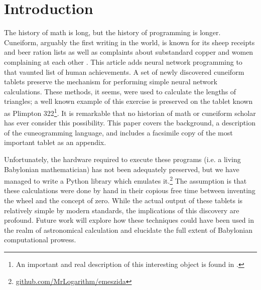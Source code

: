\documentclass[11pt]{article}
\title{\emeszida}
\author{First Author \\
  Affiliation / Address line 1 \\
  Affiliation / Address line 2 \\
  Affiliation / Address line 3 \\
  \texttt{email@domain} \\\And
  Second Author \\
  Affiliation / Address line 1 \\
  Affiliation / Address line 2 \\
  Affiliation / Address line 3 \\
  \texttt{email@domain} \\}
\begin{document}
\maketitle
\begin{abstract}
This paper announces the discovery of the use of neural nets almost 4,000 years before their use in the modern era.
Newly discovered tablets preserve a perceptron used for calculating the numbers on Plimpton 322, the most important object in the history of mathematics.
The native programming language used by the ancient Babylonian ``cuneogrammers'' uses sexagesimal numbering leading to some ``weirdness''.
\end{abstract}

\begin{abstract}[]
\end{abstract}

\section{Introduction}
The history of math is long, but the history of programming is longer.
Cuneiform, arguably the first writing in the world, is known for its sheep receipts and beer ration lists as well as complaints about substandard copper \cite{oppenheim1954} and women complaining at each other \cite{Matuszak2020}.
This article adds neural network programming to that vaunted list of human achievements.
A set of newly discovered cuneiform tablets preserve the mechanism for performing simple neural network calculations.
These methods, it seems, were used to calculate the lengths of triangles; a well known example of this exercise is preserved on the tablet known as Plimpton 322\footnote{An important and real description of this interesting object is found in \citet{robson2002}.}.
It is remarkable that no historian of math or cuneiform scholar has ever consider this possibility.
This paper covers the background, a description of the cuneogramming language, and includes a facsimile copy of the most important tablet as an appendix.

Unfortunately, the hardware required to execute these programs (i.e. a living Babylonian mathematician) has not been adequately preserved, but we have managed to write a Python library which emulates it.\footnote{\url{github.com/MrLogarithm/emeszida}}
The assumption is that these calculations were done by hand in their copious free time between inventing the wheel and the concept of zero.
While the actual output of these tablets is relatively simple by modern standards, the implications of this discovery are profound.
Future work will explore how these techniques could have been used in the realm of astronomical calculation and elucidate the full extent of Babylonian computational prowess.
\end{document}
